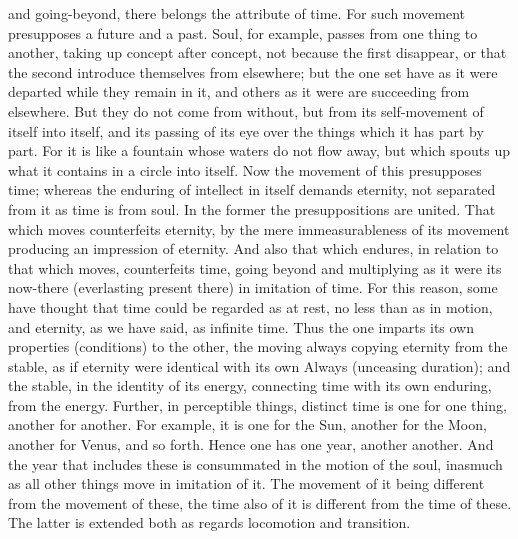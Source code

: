 \documentclass[12pt]{article}
\begin{document}
and going-beyond, there belongs the attribute of time. For such movement
presupposes a future and a past. Soul, for example, passes from one thing to
another, taking up concept after concept, not because the first disappear, or
that the second introduce themselves from elsewhere; but the one set have as it
were departed while they remain in it, and others as it were are succeeding
from elsewhere. But they do not come from without, but from its self-movement
of itself into itself, and its passing of its eye over the things which it has
part by part. For it is like a fountain whose waters do not flow away, but
which spouts up what it contains in a circle into itself. Now the movement of
this presupposes time; whereas the enduring of intellect in itself demands
eternity, not separated from it as time is from soul. In the former the
presuppositions are united. That which moves counterfeits eternity, by the mere
immeasurableness of its movement producing an impression of eternity. And also
that which endures, in relation to that which moves, counterfeits time, going
beyond and multiplying as it were its now-there (everlasting present there) in
imitation of time. For this reason, some have thought that time could be
regarded as at rest, no less than as in motion, and eternity, as we have said,
as infinite time. Thus the one imparts its own properties (conditions) to the
other, the moving always copying eternity from the stable, as if eternity were
identical with its own Always (unceasing duration); and the stable, in the
identity of its energy, connecting time with its own enduring, from the energy.
Further, in perceptible things, distinct time is one for one thing, another for
another. For example, it is one for the Sun, another for the Moon, another for
Venus, and so forth. Hence one has one year, another another. And the year that
includes these is consummated in the motion of the soul, inasmuch as all other
things move in imitation of it. The movement of it being different from the
movement of these, the time also of it is different from the time of these. The
latter is extended both as regards locomotion and transition.
\end{document}
